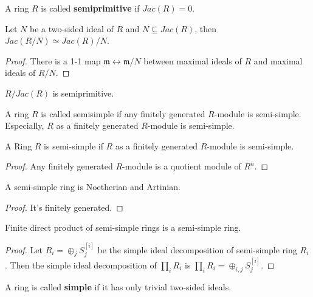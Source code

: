 \documentclass[12pt]{book}
\begin{document}
	\begin{definition}
		A ring $R$ is called {\bf semiprimitive} if $Jac(R)=0$.
	\end{definition}
	
	\begin{theorem}
		Let $N$ be a two-sided ideal of $R$ and $N\subseteq Jac(R)$, then $Jac(R/N)\simeq Jac(R)/N$.
	\end{theorem}
	\begin{proof}
		There is a 1-1 map $\mathfrak m \leftrightarrow \mathfrak m/N$ between maximal ideals of $R$ and maximal ideals of $R/N$.
	\end{proof}
	\begin{corollary}
		$R/Jac(R)$ is semiprimitive.
	\end{corollary}
	
	\begin{definition}
		A ring $R$ is called semisimple if any finitely generated $R$-module is semi-simple. Especially, $R$ as a finitely generated $R$-module is semi-simple.
	\end{definition}
	
	\begin{theorem}
		A Ring $R$ is semi-simple if $R$ as a finitely generated $R$-module is semi-simple.
	\end{theorem}
	\begin{proof}
		Any finitely generated $R$-module is a quotient module of $R^n$.
	\end{proof}
	
	\begin{theorem}
		A semi-simple ring is Noetherian and Artinian.
	\end{theorem}
	\begin{proof}
		It's finitely generated.
	\end{proof}
	
	\begin{theorem}
		Finite direct product of semi-simple rings is a semi-simple ring.
	\end{theorem}
	\begin{proof}
		Let $R_i=\oplus_j S^{[i]}_j$ be the simple ideal decomposition of semi-simple ring $R_i$. Then the simple ideal decomposition of $\prod_i R_i$ is $\prod_i R_i=\oplus_{i,j} S^{[i]}_{j}$.
	\end{proof}
	
	\begin{definition}
		A ring is called {\bf simple} if it has only trivial two-sided ideals.
	\end{definition}
	
\end{document}
